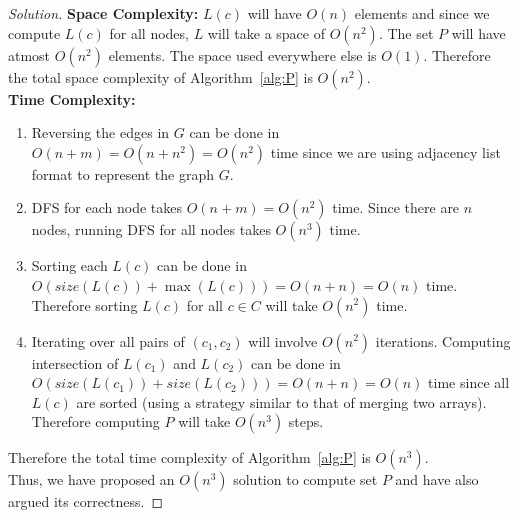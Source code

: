 \begin{solution}{2.3}
\begin{proof}[Solution]
        \textbf{Space Complexity:} $L(c)$ will have $O(n)$ elements and since we compute $L(c)$ for all nodes, $L$ will take a space of $O(n^2)$. The set $P$ will have atmost $O(n^2)$ elements. The space used everywhere else is $O(1)$. Therefore the total space complexity of Algorithm~\ref{alg:P} is $O(n^2)$.\\
        \textbf{Time Complexity:}
        \begin{enumerate}
            \item Reversing the edges in $G$ can be done in $O(n+m)=O(n+n^2)=O(n^2)$ time since we are using adjacency list format to represent the graph $G$.
            \item DFS for each node takes $O(n+m)=O(n^2)$ time. Since there are $n$ nodes, running DFS for all nodes takes $O(n^3)$ time.
            \item Sorting each $L(c)$ can be done in $O(size(L(c))+\max(L(c)))=O(n+n)=O(n)$ time. Therefore sorting $L(c)$ for all $c\in C$ will take $O(n^2)$ time.
            \item Iterating over all pairs of $(c_1, c_2)$ will involve $O(n^2)$ iterations. Computing intersection of $L(c_1)$ and $L(c_2)$ can be done in $O(size(L(c_1))+size(L(c_2)))=O(n+n)=O(n)$ time since all $L(c)$ are sorted (using a strategy similar to that of merging two arrays). Therefore computing $P$ will take $O(n^3)$ steps.
        \end{enumerate}
        Therefore the total time complexity of Algorithm~\ref{alg:P} is $O(n^3)$.\\

        Thus, we have proposed an $O(n^3)$ solution to compute set $P$ and have also argued its correctness.
    \end{proof}
\end{solution}
